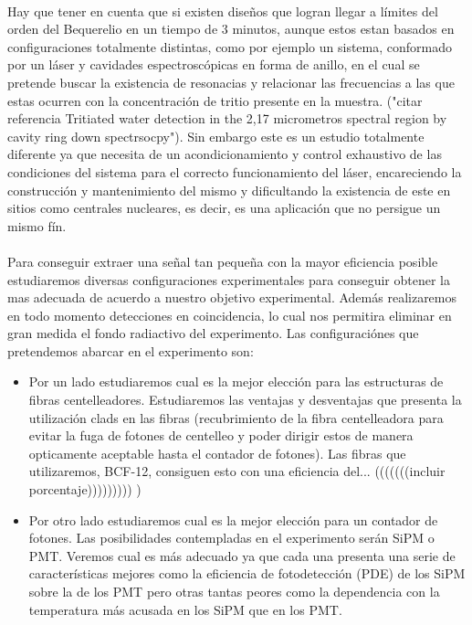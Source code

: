 \documentclass[11pt, a4paper]{article}
\begin{document}
\paragraph {}
Hay que tener en cuenta que si existen diseños que logran llegar a límites del orden del Bequerelio en un tiempo de 3 minutos, aunque estos estan basados en configuraciones totalmente distintas, como por ejemplo un sistema, conformado por un láser y cavidades espectroscópicas en forma de anillo, en el cual se pretende buscar la existencia de resonacias y relacionar las frecuencias a las que estas ocurren con la concentración de tritio presente en la muestra. ("citar referencia Tritiated water detection in the 2,17 micrometros spectral region by cavity ring down spectrsocpy"). Sin embargo este es un estudio totalmente diferente ya que necesita de un acondicionamiento y control exhaustivo de las condiciones del sistema para el correcto funcionamiento del láser, encareciendo la construcción y mantenimiento del mismo y dificultando la existencia de este en sitios como centrales nucleares, es decir, es una aplicación que no persigue un mismo fín.

\paragraph {}
Para conseguir extraer una señal tan pequeña con la mayor eficiencia posible estudiaremos diversas configuraciones experimentales para conseguir obtener la mas adecuada de acuerdo a nuestro objetivo experimental. Además realizaremos en todo momento detecciones en coincidencia, lo cual nos permitira eliminar en gran medida el fondo radiactivo del experimento. Las configuraciónes que pretendemos abarcar en el experimento son: 
\begin{itemize}
\item {}
Por un lado estudiaremos cual es la mejor elección para las estructuras de fibras centelleadores. Estudiaremos las ventajas y desventajas que presenta la utilización clads en las fibras (recubrimiento de la fibra centelleadora para evitar la fuga de fotones de centelleo y poder dirigir estos de manera opticamente aceptable hasta el contador de fotones). Las fibras que utilizaremos, BCF-12, consiguen esto con una eficiencia del... (((((((incluir porcentaje)))))))))  ) 
\item {}
Por otro lado estudiaremos cual es la mejor elección para un contador de fotones. Las posibilidades contempladas en el experimento serán SiPM o PMT. Veremos cual es más adecuado ya que cada una presenta una serie de características mejores como la eficiencia de fotodetección (PDE) de los SiPM sobre la de los PMT pero otras tantas peores como la dependencia con la temperatura más acusada en los SiPM que en los PMT.
\end{itemize}
\end{document}
